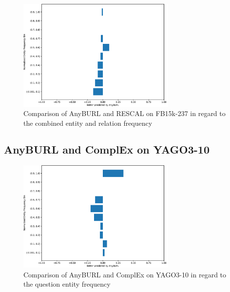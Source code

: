 \begin{figure}[H]
\centering
\includegraphics[width=0.7\textwidth]{images/combined_freq_anyburl_rescal_fb15k.PNG}
\caption{Comparison of AnyBURL and RESCAL on FB15k-237 in regard to the combined entity and relation frequency}
\label{fig:combined_freq_anyburl_rescal_fb15k}
\end{figure}



\subsection{AnyBURL and ComplEx on YAGO3-10}

\begin{figure}[H]
\centering
\includegraphics[width=0.7\textwidth]{images/entity_freq_question_anyburl_complex_yago.PNG}
\caption{Comparison of AnyBURL and ComplEx on YAGO3-10 in regard to the question entity frequency}
\label{fig:entity_question_tail_anyburl_complex_yago}
\end{figure}

